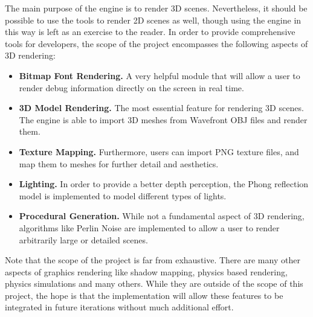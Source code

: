 The main purpose of the engine is to render 3D scenes.
Nevertheless, it should be possible to use the tools to render 2D scenes as well,
though using the engine in this way is left as an exercise to the reader.
In order to provide comprehensive tools for developers,
the scope of the project encompasses the following aspects of 3D rendering:

\begin{itemize}
  \item \textbf{Bitmap Font Rendering.} A very helpful module that will allow a user to render debug information directly on the screen in real time.
  \item \textbf{3D Model Rendering.} The most essential feature for rendering 3D scenes. The engine is able to import 3D meshes from Wavefront OBJ files and render them.
  \item \textbf{Texture Mapping.} Furthermore, users can import PNG texture files, and map them to meshes for further detail and aesthetics.
  \item \textbf{Lighting.} In order to provide a better depth perception, the Phong reflection model is implemented to model different types of lights.
  \item \textbf{Procedural Generation.} While not a fundamental aspect of 3D rendering, algorithms like Perlin Noise are implemented to allow a user to render arbitrarily large or detailed scenes.
\end{itemize}

Note that the scope of the project is far from exhaustive.
There are many other aspects of graphics rendering like shadow mapping, physics based rendering, physics simulations and many others\cite{learnopengl}.
While they are outside of the scope of this project,
the hope is that the implementation will allow these features to be integrated in future iterations without much additional effort.
